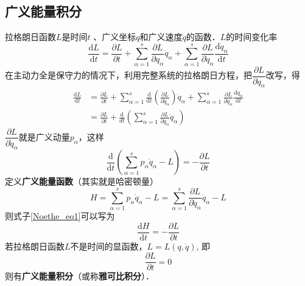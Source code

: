 \subsection{广义能量积分}

拉格朗日函数$L $是时间$t$ 、广义坐标$q $和广义速度$\dot q$的函数．$ L $的时间变化率
\begin{equation}
\frac{\mathrm{d} L}{\mathrm{d} t}=\frac{\partial L}{\partial t}+\sum_{\alpha=1}^{s} \frac{\partial L}{\partial q_{\alpha}} \dot{q}_{\alpha}+\sum_{\alpha=1}^{s} \frac{\partial L}{\partial \dot{q}_{\alpha}} \frac{\mathrm{d} \dot{q}_{\alpha}}{\mathrm{d} t}
\end{equation}
在主动力全是保守力的情况下，利用完整系统的拉格朗日方程，把$\dfrac{\partial L}{\partial q_{\alpha}}$改写，得
\begin{equation}
\begin{aligned} \frac{\mathrm{d} L}{\mathrm{d} t} &=\frac{\partial L}{\partial t}+\sum_{\alpha=1}^{s} \frac{\mathrm{d}}{\mathrm{d} t}\left(\frac{\partial L}{\partial \dot{q}_{\alpha}}\right) \dot{q}_{\alpha}+\sum_{\alpha=1}^{s} \frac{\partial L}{\partial \dot{q}_{\alpha}} \frac{\mathrm{d} \dot{q}_{\alpha}}{\mathrm{d} t} \\ &=\frac{\partial L}{\partial t}+\frac{\mathrm{d}}{d t}\left(\sum_{\alpha=1}^{s} \frac{\partial L}{\partial \dot{q}_{\alpha}} \dot{q}_{\alpha}\right) \end{aligned}
\end{equation}
$\dfrac{\partial L}{\partial \dot{q}_{\alpha}}$就是广义动量$p_\alpha$，这样
\begin{equation} \label{Noethe_eq1}
\frac{\mathrm{d}}{\mathrm{d} t}\left(\sum_{\alpha=1}^{s} p_{\alpha} \dot{q}_{\alpha}-L\right)=-\frac{\partial L}{\partial t}
\end{equation}
定义\textbf{广义能量函数}（其实就是哈密顿量）
\begin{equation} \label{Noethe_eq2}
H=\sum_{\alpha=1}^{s} p_{\alpha} \dot{q}_{\alpha}-L=\sum_{\alpha=1}^{s} \frac{\partial L}{\partial \dot{q}_{\alpha}} \dot{q}_{\alpha}-L
\end{equation}
则式子\autoref{Noethe_eq1}可以写为
\begin{equation}
\frac{\mathrm{d} H}{\mathrm{d} t}=-\frac{\partial L}{\partial t}
\end{equation}
若拉格朗日函数$L$不是时间的显函数，$ L = L(q, \dot q)$, 即
\begin{equation}
\frac{\partial L}{\partial t}=0
\end{equation}
则有\textbf{广义能量积分}（或称\textbf{雅可比积分}）．

